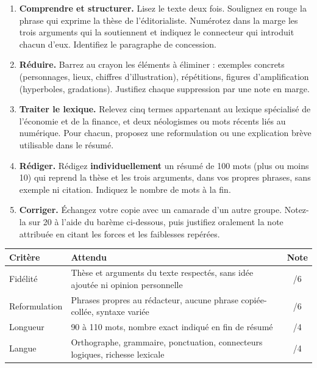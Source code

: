 \documentclass[11pt]{article}
\newcommand{\cle}[1]{{\popxbold\color{popdark}#1}}
\newcounter{popsec}
\newcounter{popsub}
\newcommand{\courssub}[1]{%
  \stepcounter{popsub}%
  \par\vspace{9pt}\noindent{\popxbold\fontsize{11.5}{13}\selectfont\color{popink}{\color{poporange}\thepopsec.\thepopsub}\hspace{6pt}#1}\par\nopagebreak\vspace{4pt}
}
\begin{document}
\begin{enumerate}
\item \textbf{Comprendre et structurer.} Lisez le texte deux fois. Soulignez en rouge la phrase qui exprime la \cle{thèse} de l'éditorialiste. Numérotez dans la marge les trois arguments qui la soutiennent et indiquez le connecteur qui introduit chacun d'eux. Identifiez le paragraphe de concession.
\item \textbf{Réduire.} Barrez au crayon les éléments à éliminer : exemples concrets (personnages, lieux, chiffres d'illustration), répétitions, figures d'amplification (hyperboles, gradations). Justifiez chaque suppression par une note en marge.
\item \textbf{Traiter le lexique.} Relevez cinq termes appartenant au lexique spécialisé de l'économie et de la finance, et deux néologismes ou mots récents liés au numérique. Pour chacun, proposez une reformulation ou une explication brève utilisable dans le résumé.
\item \textbf{Rédiger.} Rédigez \textbf{individuellement} un résumé de 100 mots (plus ou moins 10) qui reprend la thèse et les trois arguments, dans vos propres phrases, sans exemple ni citation. Indiquez le nombre de mots à la fin.
\item \textbf{Corriger.} Échangez votre copie avec un camarade d'un autre groupe. Notez-la sur 20 à l'aide du barème ci-dessous, puis justifiez oralement la note attribuée en citant les forces et les faiblesses repérées.
\end{enumerate}

\begin{center}
\begin{tabularx}{\linewidth}{|l|X|c|}
\hline
\rowcolor{popblueL} \textbf{Critère} & \textbf{Attendu} & \textbf{Note} \\
\hline
Fidélité & Thèse et arguments du texte respectés, sans idée ajoutée ni opinion personnelle & /6 \\
\hline
Reformulation & Phrases propres au rédacteur, aucune phrase copiée-collée, syntaxe variée & /6 \\
\hline
Longueur & 90 à 110 mots, nombre exact indiqué en fin de résumé & /4 \\
\hline
Langue & Orthographe, grammaire, ponctuation, connecteurs logiques, richesse lexicale & /4 \\
\hline
\end{tabularx}
\end{center}

\courssub{Ressources à mobiliser}
\end{document}
